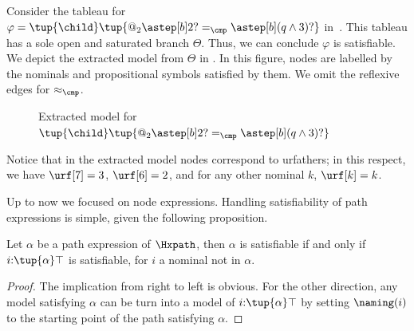 \begin{exa}
    \label{ex:extracted model}
    Consider the tableau for $\varphi = \tup{\child}\tup{@_2\astep[b]2? =_\cmp \astep[b](q\land 3)?}$ in~.
    This tableau has a sole open and saturated branch $\Theta$.
    Thus, we can conclude $\varphi$ is satisfiable.
    We depict the extracted model from $\Theta$ in .
    In this figure, nodes are labelled by the nominals and propositional symbols satisfied by them.
    We omit the reflexive edges for $\approx_\cmp$.
    \begin{figure}[t]
        \centering
        \caption{Extracted model for $\tup{\child}\tup{@_2\astep[b]2? =_\cmp \astep[b](q\land 3)?}$}
        \label{ex:extracted:model}
    \end{figure}
    Notice that in the extracted model nodes correspond to urfathers; in this respect, we have $\urf[7]=3$, $\urf[6]=2$, and for any other nominal $k$, $\urf[k]=k$.
\end{exa}

Up to now we focused on node expressions.  Handling satisfiability of path expressions is simple, given the following proposition. 

\begin{prop}
	Let $\alpha$ be a path expression of $\Hxpath$, then $\alpha$ is satisfiable if and only if $i{:}\tup{\alpha}\top$ is satisfiable, for $i$ a nominal not in $\alpha$. 
\end{prop}	

\begin{proof}
	The implication from right to left is obvious.  For the other direction, any model satisfying $\alpha$ can be turn into a model of $i{:}\tup{\alpha}\top$ by setting $\naming(i)$ to the starting point of the path satisfying $\alpha$. 
\end{proof}	
	